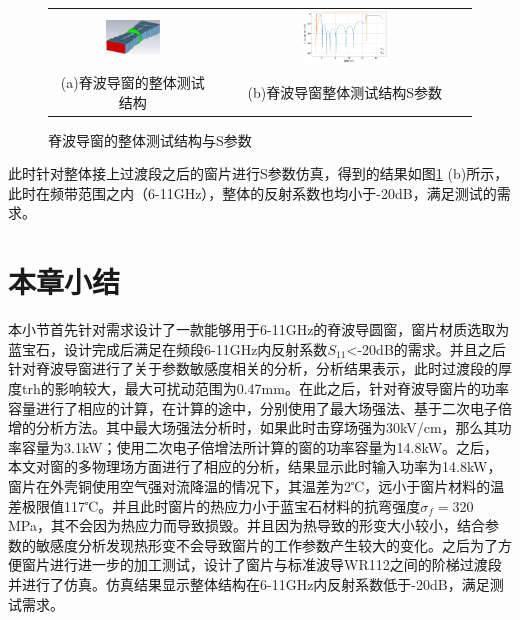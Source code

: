 \documentclass[master]{thesis-uestc}
\begin{document}
\begin{figure}[!htb]
    \small
    \centering
    \begin{tabular}{@{\ }c@{\ }c}
        \includegraphics[width=0.35\textwidth]{pic/chapter3/脊波导窗整体测试结构.png} & 
        \hspace{5pt}
        \includegraphics[width=0.35\textwidth]{pic/chapter3/脊波导窗整体S参数.png}     \\
        \mbox{\small (a)脊波导窗的整体测试结构}                                                                               & 
        \mbox{\small (b)脊波导窗整体测试结构S参数}                                                                                  \\
    \end{tabular}
    \caption{脊波导窗的整体测试结构与S参数}
    \label{fig:脊波导窗的整体测试结构与S参数}
\end{figure}

此时针对整体接上过渡段之后的窗片进行S参数仿真，得到的结果如图\ref{fig:脊波导窗的整体测试结构与S参数} (b)所示，此时在频带范围之内（6-11GHz），整体的反射系数也均小于-20dB，满足测试的需求。


\section{本章小结}
本小节首先针对需求设计了一款能够用于6-11GHz的脊波导圆窗，窗片材质选取为蓝宝石，设计完成后满足在频段6-11GHz内反射系数\(S_{11}\)<-20dB的需求。并且之后针对脊波导窗进行了关于参数敏感度相关的分析，分析结果表示，此时过渡段的厚度trh的影响较大，最大可扰动范围为0.47mm。在此之后，针对脊波导窗片的功率容量进行了相应的计算，在计算的途中，分别使用了最大场强法、基于二次电子倍增的分析方法。其中最大场强法分析时，如果此时击穿场强为30kV/cm，那么其功率容量为3.1kW；使用二次电子倍增法所计算的窗的功率容量为14.8kW。之后，本文对窗的多物理场方面进行了相应的分析，结果显示此时输入功率为14.8kW，窗片在外壳铜使用空气强对流降温的情况下，其温差为2℃，远小于窗片材料的温差极限值117℃。并且此时窗片的热应力小于蓝宝石材料的抗弯强度\(\sigma_f = 320\)MPa，其不会因为热应力而导致损毁。并且因为热导致的形变大小较小，结合参数的敏感度分析发现热形变不会导致窗片的工作参数产生较大的变化。之后为了方便窗片进行进一步的加工测试，设计了窗片与标准波导WR112之间的阶梯过渡段并进行了仿真。仿真结果显示整体结构在6-11GHz内反射系数低于-20dB，满足测试需求。
\end{document}
